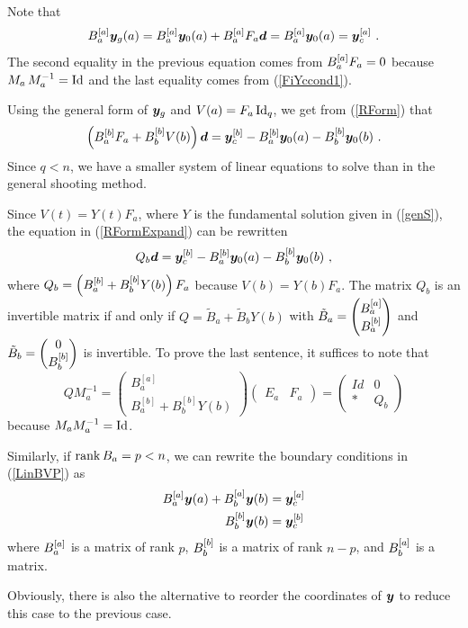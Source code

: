 Note that
\[
B_a^{[a]} \bm{y}_g(a) = B_a^{[a]} \bm{y}_0(a) + B_a^{[a]} F_a \bm{d}
 = B_a^{[a]} \bm{y}_0(a) = \bm{y}_{c}^{[a]} \ .
\]
The second equality in the previous equation comes from
$\displaystyle B_a^{[a]} F_a=0$ because
$\displaystyle M_a\,M_a^{-1} = \operatorname{Id}$ and the last equality comes from
(\ref{FiYccond1}).

Using the general form of $\bm{y}_g$ and $V(a) = F_a \operatorname{Id}_q$, we get
from (\ref{RForm}) that
\begin{equation} \label{RFormExpand}
\left( B_a^{[b]} F_a + B_b^{[b]} V(b) \right)\bm{d} = \bm{y}_c^{[b]}
- B_a^{[b]} \bm{y}_0(a) - B_b^{[b]} \bm{y}_0(b) \ .
\end{equation}
Since $q<n$, we have a smaller system of linear equations to solve
than in the general shooting method.


Since $V(t) = Y(t) F_a$, where $Y$ is the fundamental solution
given in (\ref{genS}), the equation in (\ref{RFormExpand}) can be rewritten
\[
Q_b \bm{d} = \bm{y}_c^{[b]} - B_a^{[b]}\bm{y}_0(a) - B_b^{[b]}\bm{y}_0(b) \ ,
\]
where $\displaystyle Q_b = \left( B_a^{[b]} + B_b^{[b]} Y(b) \right) F_a$
because $V(b) = Y(b) F_a$.  The matrix $Q_b$
is an invertible  matrix if and only if
$Q = \tilde{B}_a + \tilde{B}_b Y(b)$
with $\displaystyle \tilde{B}_a = \begin{pmatrix} B_a^{[a]} \\ B_a^{[b]}
\end{pmatrix}$
and $\displaystyle \tilde{B}_b = \begin{pmatrix} 0 \\ B_b^{[b]}
\end{pmatrix}$ is invertible.  To prove the last sentence, it suffices
to note that
\[
Q M_a^{-1} = \begin{pmatrix} B_a^{[a]} \\ B_a^{[b]} + B_b^{[b]}Y(b) \end{pmatrix}
\begin{pmatrix} E_a & F_a \end{pmatrix}
= \begin{pmatrix} Id & 0 \\ * & Q_b \end{pmatrix}
\]
because $\displaystyle M_a M_a^{-1} = \operatorname{Id}$.

\begin{rmk}
Similarly, if $\operatorname{rank} B_a = p < n$, we can rewrite the boundary
conditions in (\ref{LinBVP}) as
\begin{align*}
B_a^{[a]} \bm{y}(a) + B_b^{[a]} \bm{y}(b) &= \bm{y}_c^{[a]} \\
B_b^{[b]} \bm{y}(b) &= \bm{y}_c^{[b]}
\end{align*}
where $\displaystyle B_a^{[a]}$ is a  matrix of rank $p$,
$\displaystyle B_b^{[b]}$ is a  matrix of rank $n-p$, and
$\displaystyle B_b^{[a]}$ is a  matrix.

Obviously, there is also the alternative to reorder the coordinates
of $\bm{y}$ to reduce this case to the previous case.
\end{rmk}

